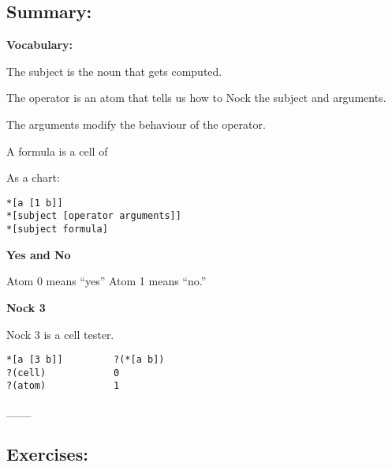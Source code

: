 \subsection{Summary:}

\textbf{Vocabulary:}

The subject is the noun that gets computed.

The operator is an atom that tells us how to Nock the subject and arguments.

The arguments modify the behaviour of the operator.

A formula is a cell of 

As a chart:
\begin{framed_shaded}
\begin{Verbatim}[fontsize=\relsize{-2.5},fontseries=b,commandchars=\\\{\}]
*[a [1 b]] 
*[subject [operator arguments]]
*[subject formula]
\end{Verbatim}
\end{framed_shaded}
\textbf{Yes and No}

Atom 0 means ``yes'' 
Atom 1 means ``no.'' 

\textbf{Nock 3}

Nock 3 is a cell tester.
\begin{framed_shaded}
\begin{Verbatim}[fontsize=\relsize{-2.5},fontseries=b,commandchars=\\\{\}]
*[a [3 b]]         ?(*[a b])
?(cell)            0
?(atom)            1
\end{Verbatim}
\end{framed_shaded}
\_\_\_

\subsection{Exercises:}

